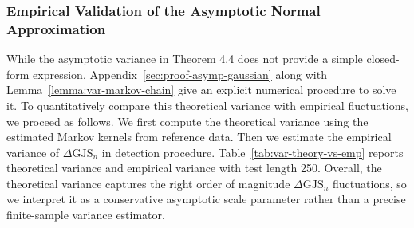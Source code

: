 \documentclass{article}
\theoremstyle{plain}
\theoremstyle{definition}
\theoremstyle{remark}
\begin{document}
\begin{table}[htbp]
\caption{Scaling of the empirically optimal number of bins $k$ with  $N$.}
\label{tab:k-vs-N}
\end{table}

\subsubsection{Empirical Validation of the Asymptotic Normal Approximation} \label{sec:shapiro-wilk}
While the asymptotic variance in Theorem 4.4 does not provide a simple closed-form expression, Appendix~\ref{sec:proof-asymp-gaussian} along with Lemma~\ref{lemma:var-markov-chain} give an explicit numerical procedure to solve it. To quantitatively compare this theoretical variance with empirical fluctuations, we proceed as follows. We first compute the theoretical variance using the estimated Markov kernels from reference data. Then we estimate the empirical variance of $\Delta \text{GJS}_n$ in detection procedure. Table~\ref{tab:var-theory-vs-emp} reports theoretical variance and empirical variance with test length 250. Overall, the theoretical variance captures the right order of magnitude $\Delta \text{GJS}_n$ fluctuations, so we interpret it as a conservative asymptotic scale parameter rather than a precise finite-sample variance estimator.
\end{document}
